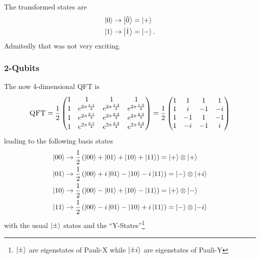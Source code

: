 The transformed states are
\begin{align}
    \ket{0} \rightarrow \ket{\hat{0}}&=\ket{+}\\
    \ket{1} \rightarrow \ket{\hat{1}}&=\ket{-}.
\end{align}
Admitedly that was not very exciting.
\subsubsection*{2-Qubits}
The now 4-dimensional \textsc{QFT} is
\begin{align}
    \textsc{QFT} = \frac{1}{2} \begin{pmatrix}
        1 & 1 & 1 & 1 \\
        1 & e^{2\pi \frac{1\cdot 1}{4}} & e^{2\pi \frac{1\cdot 2}{4}} & e^{2\pi \frac{1\cdot 3}{4}} \\
        1 & e^{2\pi \frac{2\cdot 1}{4}} & e^{2\pi \frac{2\cdot 2}{4}} & e^{2\pi \frac{2\cdot 3}{4}} \\
        1 & e^{2\pi \frac{3\cdot 1}{4}} & e^{2\pi \frac{3\cdot 2}{4}} & e^{2\pi \frac{3\cdot 3}{4}} \\
    \end{pmatrix} = \frac{1}{2} \begin{pmatrix}
        1 & 1 & 1 & 1 \\
        1 & i & -1 & -i \\
1 & -1 & 1 & -1 \\
1 & -i & -1 & i \\
    \end{pmatrix}
\end{align}
leading to the following basis states
\begin{align}
    \ket{00}   &\rightarrow  \frac{1}{2}\left( \ket{00} + \ket{01} + \ket{10} + \ket{11} \right) = \ket{+}\otimes\ket{+}\\
    \ket{01}   &\rightarrow  \frac{1}{2}\left( \ket{00} + i\ket{01} - \ket{10} -i \ket{11} \right) = \ket{-}\otimes\ket{+i}\\
    \ket{10}   &\rightarrow  \frac{1}{2}\left( \ket{00} - \ket{01} +\ket{10} -\ket{11} \right) = \ket{+}\otimes\ket{-}\\
    \ket{11}   &\rightarrow  \frac{1}{2}\left( \ket{00} -i \ket{01} - \ket{10} +i \ket{11} \right) = \ket{-}\otimes\ket{-i}\\
\end{align}
with the usual $\ket{\pm}$ states and the ``Y-States''\footnote{$\ket{\pm}$ are eigenstates of Pauli-X while $\ket{\pm i}$ are eigenstates of Pauli-Y}
